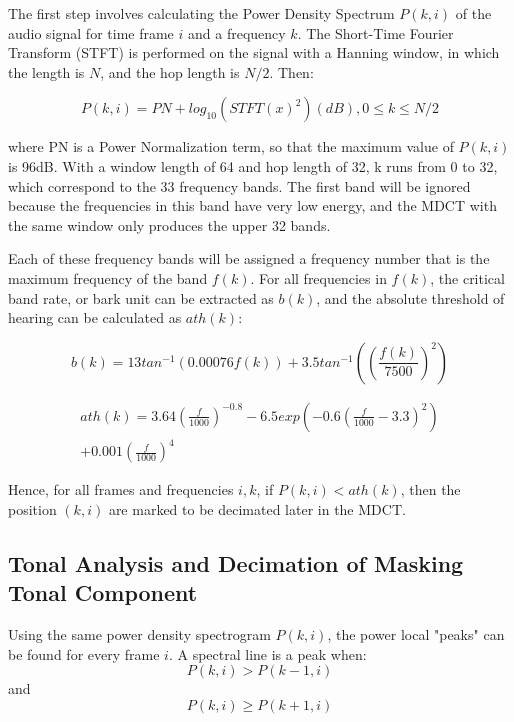 \documentclass[conference]{IEEEtran}
\begin{document}
	The first step involves calculating the Power Density Spectrum $P(k,i)$ of the audio signal for time frame $i$ and a frequency $k$. The Short-Time Fourier Transform (STFT) is performed on the signal with a Hanning window, in which the length is $N$, and the hop length is $N/2$. Then:
	
	\begin{equation}
	P(k,i) = PN + log_{10}(STFT(x)^2) (dB), 0 \le k \le N/2
	\label{eq8}
	\end{equation}
	
	where PN is a Power Normalization term, so that the maximum value of $P(k,i)$ is 96dB. With a window length of 64 and hop length of 32, k runs from 0 to 32, which correspond to the 33 frequency bands. The first band will be ignored because the frequencies in this band have very low energy, and the MDCT with the same window only produces the upper 32 bands.
	
	Each of these frequency bands will be assigned a frequency number that is the maximum frequency of the band $f(k)$. For all frequencies in $f(k)$, the critical band rate, or bark unit can be extracted as $b(k)$, and the absolute threshold of hearing can be calculated as $ath(k)$:
	
	\begin{equation}
	b(k) = 13 tan^{-1}(0.00076f(k)) + 3.5 tan^{-1}((\frac{f(k)}{7500})^2)
	\label{eq9}
	\end{equation}
	
	\begin{equation}
	\begin{split}
	ath(k) = 3.64(\frac{f}{1000})^{-0.8} - 6.5exp(-0.6(\frac{f}{1000} - 3.3)^2) \\
	+ 0.001(\frac{f}{1000})^4
	\label{eq10}
	\end{split}
	\end{equation}
	
	Hence, for all frames and frequencies $i, k$, if $P(k,i) < ath(k)$, then the position $(k,i)$ are marked to be decimated later in the MDCT.
	
	\subsection{Tonal Analysis and Decimation of Masking Tonal Component}
	
	Using the same power density spectrogram $P(k,i)$, the power local "peaks" can be found for every frame $i$. A spectral line is a peak when:
	$$P(k,i) > P(k-1,i)$$ 
	and 
	$$P(k,i) \ge P(k+1,i)$$
	
\end{document}
